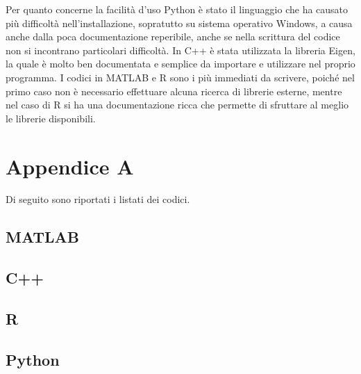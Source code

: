 \documentclass[a4paper,12pt]{article}
\begin{document}
\noindent Per quanto concerne la facilità d'uso Python è stato il linguaggio che ha causato più difficoltà nell'installazione, sopratutto su sistema operativo Windows, a causa anche dalla poca documentazione reperibile, anche se nella scrittura del codice non si incontrano particolari difficoltà. In C++ è stata utilizzata la libreria Eigen, la quale è molto ben documentata e semplice da importare e utilizzare nel proprio programma.
I codici in MATLAB e R sono i più immediati da scrivere, poiché nel primo caso non è necessario effettuare alcuna ricerca di librerie esterne, mentre nel caso di R si ha una documentazione ricca che permette di sfruttare al meglio le librerie disponibili.

\newpage
\fancyhf{}
\fancyfoot[C]{\thepage}

\section{Appendice A}
Di seguito sono riportati i listati dei codici.

\subsection{MATLAB}


\fancyhf{}
\rhead{\leftmark}
\fancyfoot[C]{\thepage}

\newpage
\subsection{C++}




\newpage
\subsection{R}


\newpage
\subsection{Python}

\end{document}
